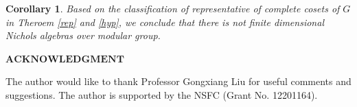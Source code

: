 \documentclass{amsproc}
\newtheorem{cor}[thm]{Corollary}%
\theoremstyle{definition}
\theoremstyle{remark}
\numberwithin{equation}{section}
\begin{document}
\begin{cor}
Based on the classification of representative of complete cosets of $G$ in Theroem \ref{rep} and \ref{hyp},
we conclude that there is not finite dimensional Nichols algebras over modular group.
\end{cor}





























































































\begin{center}
$\mathbf{ACKNOWLEDGMENT}$
\end{center}

The author would  like to thank Professor Gongxiang Liu for useful comments and suggestions. 
The  author is supported by the  NSFC (Grant No. 12201164). 
\end{document}
